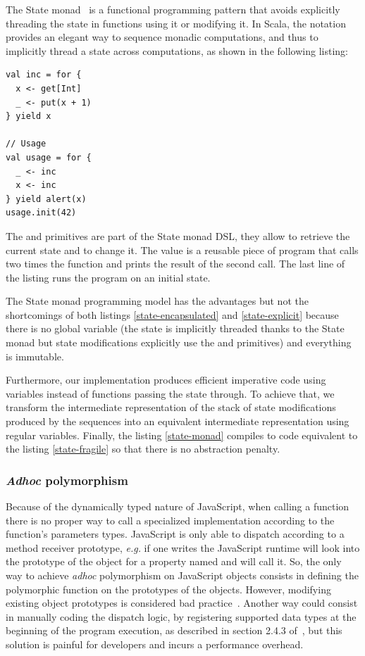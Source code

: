 \documentclass[american,english,runningheads]{llncs}
\newcommand{\eg}{\emph{e.g.}}
\begin{document}
The State monad~\cite{Wadler92_StateM} is a functional programming pattern that avoids explicitly threading the state
in functions using it or modifying it. In Scala, the  notation provides an elegant way to sequence monadic
computations, and thus to implicitly thread a state across computations, as shown in the following listing:

\begin{lstlisting}[label=state-monad,caption=Implicitly threaded state using the State Monad]
val inc = for {
  x <- get[Int]
  _ <- put(x + 1)
} yield x

// Usage
val usage = for {
  _ <- inc
  x <- inc
} yield alert(x)
usage.init(42)
\end{lstlisting}

The  and  primitives are part of the State monad DSL, they allow to retrieve the current state
and to change it. The  value is a reusable piece of program that calls two times the  function
and prints the result of the second call. The last line of the listing runs the  program on an initial
state.

The State monad programming model has the advantages but not the shortcomings of both listings
\ref{state-encapsulated} and \ref{state-explicit} because there is no global variable (the state is implicitly
threaded thanks to the State monad but state modifications explicitly use the  and  primitives)
and everything is immutable.

Furthermore, our implementation produces efficient imperative code using variables instead of functions passing the
state through. To achieve that, we transform the intermediate representation of the stack of state modifications
produced by the  sequences into an equivalent intermediate representation using regular variables. Finally,
the listing \ref{state-monad} compiles to code equivalent to the listing \ref{state-fragile} so that there is no
abstraction penalty.

\subsubsection{\emph{Adhoc} polymorphism}

Because of the dynamically typed nature of JavaScript, when calling a function there is no proper way to call a
specialized implementation according to the function’s parameters types. JavaScript is only able to dispatch
according to a method receiver prototype, \eg{} if one writes  the JavaScript runtime will look into
the prototype of the  object for a property named  and will call it. So, the only way to achieve
\emph{adhoc} polymorphism on JavaScript objects consists in defining the polymorphic function on the prototypes of
the objects. However, modifying existing object prototypes is considered bad
practice~\cite{Zakas12_MaintainableJs}. Another way could consist in manually coding the dispatch logic, by registering
supported data types at the beginning of the program execution, as described in section 2.4.3
of~\cite{Abelson83_SICP}, but this solution is painful for developers and incurs a performance overhead.
\end{document}
